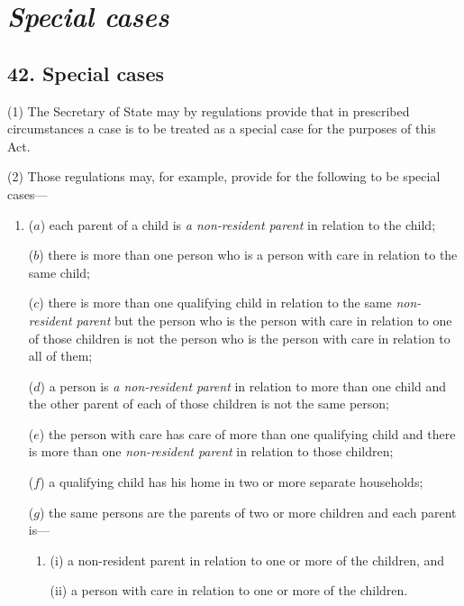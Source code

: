 \documentclass[12pt,a4paper]{article}
\begin{document}

\section{\itshape Special cases}

\subsection{42. Special cases}

(1) The Secretary of State may by regulations provide that in prescribed circumstances a case is to be treated as a special case for the purposes of this Act.

(2) Those regulations may, for example, provide for the following to be special cases—
\begin{enumerate}\item[]
($a$) each parent of a child is 
\emph{a non-resident parent}  %
in relation to the child;

($b$) there is more than one person who is a person with care in relation to the same child;

($c$) there is more than one qualifying child in relation to the same 
\emph{non-resident parent}  %
but the person who is the person with care in relation to one of those children is not the person who is the person with care in relation to all of them;

($d$) a person is 
\emph{a non-resident parent}  %
in relation to more than one child and the other parent of each of those children is not the same person;

($e$) the person with care has care of more than one qualifying child and there is more than one 
\emph{non-resident parent}  %
in relation to those children;

($f$) a qualifying child has his home in two or more separate households;

($g$) the same persons are the parents of two or more children and each parent is---
\begin{enumerate}\item[]
(i) a non-resident parent in relation to one or more of the children, and

(ii) a person with care in relation to one or more of the children.
\end{enumerate}
\end{enumerate}
\end{document}
